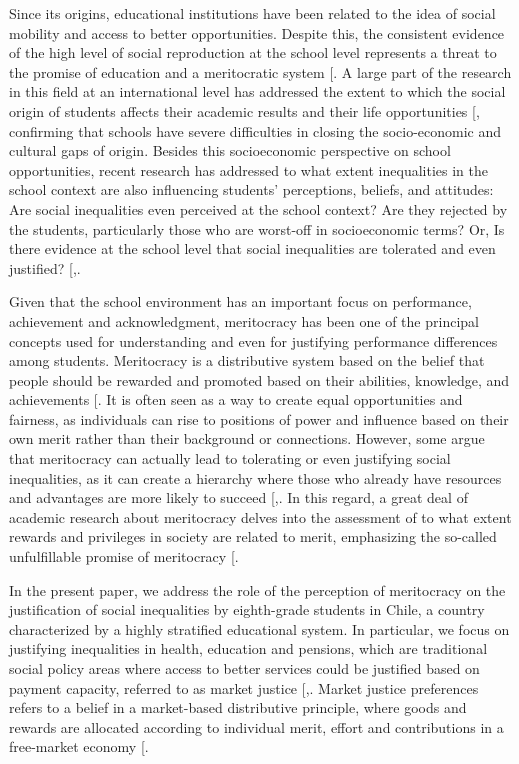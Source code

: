 \documentclass[
  12pt,
  letterpaper,
]{article}
\begin{document}
Since its origins, educational institutions have been related to the
idea of social mobility and access to better opportunities. Despite
this, the consistent evidence of the high level of social reproduction
at the school level represents a threat to the promise of education and
a meritocratic system
{[}\citeproc{ref-bourdieu_reproduction_1990}{1}{]}. A large part of the
research in this field at an international level has addressed the
extent to which the social origin of students affects their academic
results and their life opportunities
{[}\citeproc{ref-vonhippel_test_2019}{2}{]}, confirming that schools
have severe difficulties in closing the socio-economic and cultural gaps
of origin. Besides this socioeconomic perspective on school
opportunities, recent research has addressed to what extent inequalities
in the school context are also influencing students' perceptions,
beliefs, and attitudes: Are social inequalities even perceived at the
school context? Are they rejected by the students, particularly those
who are worst-off in socioeconomic terms? Or, Is there evidence at the
school level that social inequalities are tolerated and even justified?
{[},\citeproc{ref-wiederkehr_belief_2015}{4}{]}.

Given that the school environment has an important focus on performance,
achievement and acknowledgment, meritocracy has been one of the
principal concepts used for understanding and even for justifying
performance differences among students. Meritocracy is a distributive
system based on the belief that people should be rewarded and promoted
based on their abilities, knowledge, and achievements
{[}\citeproc{ref-young_rise_1958}{5}{]}. It is often seen as a way to
create equal opportunities and fairness, as individuals can rise to
positions of power and influence based on their own merit rather than
their background or connections. However, some argue that meritocracy
can actually lead to tolerating or even justifying social inequalities,
as it can create a hierarchy where those who already have resources and
advantages are more likely to succeed
{[},\citeproc{ref-mcnamee_meritocracy_2004}{7}{]}.
In this regard, a great deal of academic research about meritocracy
delves into the assessment of to what extent rewards and privileges in
society are related to merit, emphasizing the so-called unfulfillable
promise of meritocracy {[}\citeproc{ref-mijs_stratified_2016}{8}{]}.

In the present paper, we address the role of the perception of
meritocracy on the justification of social inequalities by eighth-grade
students in Chile, a country characterized by a highly stratified
educational system. In particular, we focus on justifying inequalities
in health, education and pensions, which are traditional social policy
areas where access to better services could be justified based on
payment capacity, referred to as market justice
{[},\citeproc{ref-lindh_bringing_2023}{10}{]}.
Market justice preferences refers to a belief in a market-based
distributive principle, where goods and rewards are allocated according
to individual merit, effort and contributions in a free-market economy
{[}\citeproc{ref-lindh_public_2015}{11}{]}.
\end{document}
